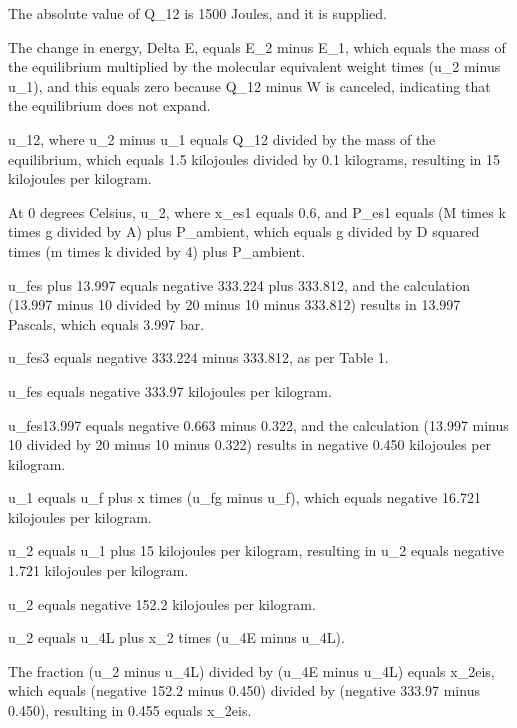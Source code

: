 The absolute value of Q_12 is 1500 Joules, and it is supplied.

The change in energy, Delta E, equals E_2 minus E_1, which equals the mass of the equilibrium multiplied by the molecular equivalent weight times (u_2 minus u_1), and this equals zero because Q_12 minus W is canceled, indicating that the equilibrium does not expand.

u_12, where u_2 minus u_1 equals Q_12 divided by the mass of the equilibrium, which equals 1.5 kilojoules divided by 0.1 kilograms, resulting in 15 kilojoules per kilogram.

At 0 degrees Celsius, u_2, where x_es1 equals 0.6, and P_es1 equals (M times k times g divided by A) plus P_ambient, which equals g divided by D squared times (m times k divided by 4) plus P_ambient.

u_fes plus 13.997 equals negative 333.224 plus 333.812, and the calculation (13.997 minus 10 divided by 20 minus 10 minus 333.812) results in 13.997 Pascals, which equals 3.997 bar.

u_fes3 equals negative 333.224 minus 333.812, as per Table 1.

u_fes equals negative 333.97 kilojoules per kilogram.

u_fes13.997 equals negative 0.663 minus 0.322, and the calculation (13.997 minus 10 divided by 20 minus 10 minus 0.322) results in negative 0.450 kilojoules per kilogram.

u_1 equals u_f plus x times (u_fg minus u_f), which equals negative 16.721 kilojoules per kilogram.

u_2 equals u_1 plus 15 kilojoules per kilogram, resulting in u_2 equals negative 1.721 kilojoules per kilogram.

u_2 equals negative 152.2 kilojoules per kilogram.

u_2 equals u_4L plus x_2 times (u_4E minus u_4L).

The fraction (u_2 minus u_4L) divided by (u_4E minus u_4L) equals x_2eis, which equals (negative 152.2 minus 0.450) divided by (negative 333.97 minus 0.450), resulting in 0.455 equals x_2eis.